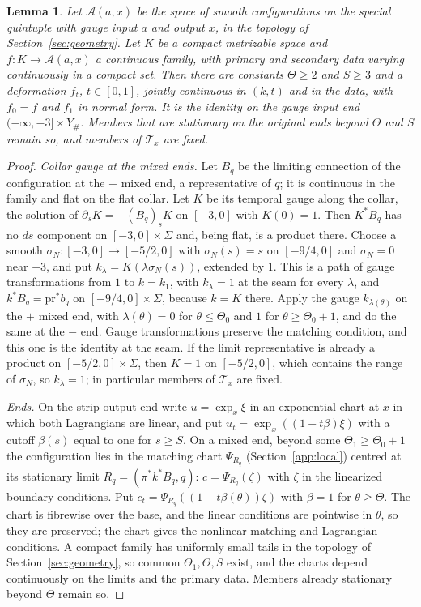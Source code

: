 \documentclass[11pt]{amsart}
\newtheorem{lemma}[theorem]{Lemma}
\theoremstyle{definition}
\theoremstyle{remark}
\theoremstyle{plain}
\numberwithin{equation}{section}
\begin{document}
\begin{lemma}\label{lem:preparation}
Let $\mathcal A(a,x)$ be the space of smooth configurations on the
special quintuple with gauge input $a$ and output $x$, in the topology
of Section~\ref{sec:geometry}. Let $K$ be a compact metrizable space and
$f:K\to\mathcal A(a,x)$ a continuous family, with primary and secondary
data varying continuously in a compact set. Then there are constants
$\Theta\ge2$ and $S\ge3$ and a deformation $f_t$, $t\in[0,1]$, jointly continuous in
$(k,t)$ and in the data, with $f_0=f$ and $f_1$ in normal form. It is
the identity on the gauge input end $(-\infty,-3]\times Y_\#$. Members
that are stationary on the original ends beyond $\Theta$ and $S$ remain
so, and members of $\mathcal T_x$ are fixed.
\end{lemma}
\begin{proof}
\emph{Collar gauge at the mixed ends.} Let $B_q$ be the limiting
connection of the configuration at the $+$ mixed end, a representative
of $q$; it is continuous in the family and
flat on the flat collar. Let $K$ be its temporal gauge along the collar,
the solution of $\partial_sK=-(B_q)_sK$ on $[-3,0]$ with $K(0)=1$. Then
$K^*B_q$ has no $ds$ component on $[-3,0]\times\Sigma$ and, being flat, is a
product there. Choose a smooth $\sigma_N:[-3,0]\to[-5/2,0]$ with
$\sigma_N(s)=s$ on $[-9/4,0]$ and $\sigma_N=0$ near $-3$, and put
$k_\lambda=K(\lambda\sigma_N(s))$, extended by $1$. This is a path of gauge
transformations from $1$ to $k=k_1$, with $k_\lambda=1$ at the seam for every
$\lambda$, and $k^*B_q=\mathrm{pr}^*b_q$ on $[-9/4,0]\times\Sigma$, because $k=K$
there. Apply the gauge $k_{\lambda(\theta)}$ on the $+$ mixed end, with
$\lambda(\theta)=0$ for $\theta\le\Theta_0$ and $1$ for $\theta\ge\Theta_0+1$,
and do the same at the $-$ end. Gauge transformations preserve the
matching condition, and this one is the identity at the seam. If the limit
representative is already a product on $[-5/2,0]\times\Sigma$, then $K=1$ on
$[-5/2,0]$, which contains the range of $\sigma_N$, so $k_\lambda=1$; in
particular members of $\mathcal T_x$ are fixed.

\emph{Ends.} On the strip output end write $u=\exp_x\xi$ in an exponential
chart at $x$ in which both Lagrangians are linear, and put
$u_t=\exp_x((1-t\beta)\xi)$ with a cutoff $\beta(s)$ equal to one for
$s\ge S$. On a mixed end, beyond some $\Theta_1\ge\Theta_0+1$ the
configuration lies in the matching chart $\Psi_{R_q}$ (Section~\ref{app:local})
centred at its stationary limit $R_q=(\pi^*k^*B_q,q)$:
$c=\Psi_{R_q}(\zeta)$ with $\zeta$ in the linearized boundary conditions.
Put $c_t=\Psi_{R_q}((1-t\beta(\theta))\zeta)$ with $\beta=1$ for
$\theta\ge\Theta$. The chart is fibrewise over the base, and the linear
conditions are pointwise in $\theta$, so they are preserved; the chart
gives the nonlinear matching and Lagrangian conditions. A compact family
has uniformly small tails in the topology of Section~\ref{sec:geometry},
so common $\Theta_1,\Theta,S$ exist, and the charts depend continuously on
the limits and the primary data. Members already stationary beyond $\Theta$
remain so.


\end{proof}
\end{document}
